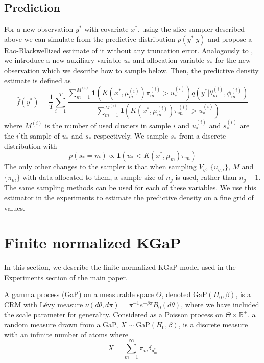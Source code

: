 \documentclass{article} %
\newcommand{\reals}{\mathbb{R}}
\newcommand{\GaP}{\text{GaP}}
\newcommand{\idf}[1]{\mathbf 1 \left ( #1 \right )}
\begin{document}
\subsection{Prediction}

For a new observation $y^*$ with covariate $x^*$, using the slice sampler 
described above we can 
simulate from the predictive distribution $p(y^*|y)$ and propose a
Rao-Blackwellized estimate of it without any truncation error.
Analogously to \cite{GriffinWalker:2011}, we
introduce a new auxiliary variable $u_*$ and allocation variable
$s_*$ for the new observation which we describe how to sample below.  
Then, the predictive density estimate is defined as
\begin{equation}
  \hat{f}(y^*) = \frac{1}{T} \sum_{i=1}^T
  \frac{\sum_{m=1}^{M^{(i)}}\idf{K(x^*,\mu^{(i)}_m)\pi^{(i)}_m >
  u^{(i)}_*}q \left (y^*|\theta^{(i)}_m,\phi^{(i)}_m \right )}{
  \sum_{m=1}^{M^{(i)}}
  \idf{K(x^*,\mu^{(i)}_m)\pi^{(i)}_m > u^{(i)}_*} }
  \label{eqn:rbpred}
\end{equation}
where $M^{(i)}$ is the number of used clusters in sample $i$ and $u^{(i)}_*$
and $s^{(i)}_*$ are the $i$'th sample of $u_*$ and $s_*$ respectively.
We sample $s_*$ from a discrete distribution with
\begin{equation}
  p(s_* = m) \propto \idf{u_* < K(x^*,\mu_m)\pi_m}
  \label{eqn:spred}
\end{equation}
The only other changes to the sampler is that when sampling $V_g$,
$\{u_{g,i}\}$, $M$ and $\{\pi_m\}$ with data allocated to them, a sample size
of $n_g$ is used, rather than $n_g -1$.  The same sampling methods can be used
for each of these variables.  We use this estimator in the experiments to
estimate the predictive density on a fine grid of values.

%

\section{Finite normalized KGaP}
\label{sec:finitegap}

In this section, we describe the finite normalized KGaP model used in the Experiments section of the main paper.

A gamma process (GaP) on a measurable space $\Theta$, denoted
$\GaP(H_0,\beta)$, is a CRM with L\'evy measure $\nu(d\theta,d\pi) =
\pi^{-1}e^{-\beta\pi}B_0(d\theta)$, where we have included the scale parameter
for generality.  Considered as a Poisson process on $\Theta \times \reals^+$,
a random measure drawn from a GaP, $X \sim \GaP(H_0,\beta)$, is a discrete
measure with an infinite number of atoms \cite{Kingman:1993} where
\begin{equation}
  X = \sum_{m=1}^\infty \pi_m \delta_{\theta^*_m}
  \label{eqn:gap}
\end{equation}
\end{document}
